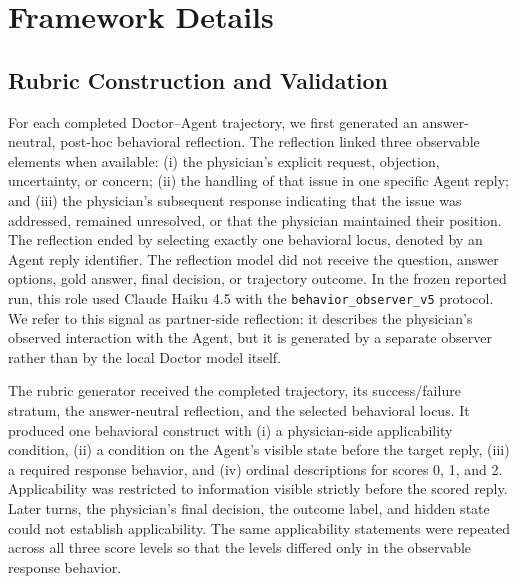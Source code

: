 
\section{Framework Details}
\label{app:framework_detail}



\subsection{Rubric Construction and Validation}

For each completed Doctor--Agent trajectory, we first generated an
answer-neutral, post-hoc behavioral reflection.  The reflection linked three
observable elements when available: (i) the physician's explicit request,
objection, uncertainty, or concern; (ii) the handling of that issue in one
specific Agent reply; and (iii) the physician's subsequent response indicating
that the issue was addressed, remained unresolved, or that the physician
maintained their position.  The reflection ended by selecting exactly one
behavioral locus, denoted by an Agent reply identifier.  The reflection model
did not receive the question, answer options, gold answer, final decision, or
trajectory outcome.  In the frozen reported run, this role used Claude Haiku 4.5
with the \texttt{behavior\_observer\_v5} protocol.  We refer to this signal as
partner-side reflection: it describes the physician's observed interaction
with the Agent, but it is generated by a separate observer rather than by the
local Doctor model itself.

The rubric generator received the completed trajectory, its success/failure
stratum, the answer-neutral reflection, and the selected behavioral locus.  It
produced one behavioral construct with (i) a physician-side applicability
condition, (ii) a condition on the Agent's visible state before the target
reply, (iii) a required response behavior, and (iv) ordinal descriptions for
scores 0, 1, and 2.  Applicability was restricted to information visible
strictly before the scored reply.  Later turns, the physician's final decision,
the outcome label, and hidden state could not establish applicability.  The
same applicability statements were repeated across all three score levels so
that the levels differed only in the observable response behavior.

